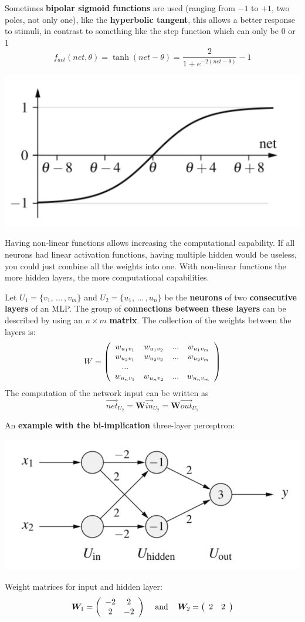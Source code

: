Sometimes \textbf{bipolar sigmoid functions} are used (ranging from $-1$ to $+1$, two poles, not only one), like the \textbf{hyperbolic tangent}, this allows a better response to stimuli, in contrast to something like the step function which can only be 0 or 1
$$ f_{act} (net, \theta) = \tanh (net - \theta) = \frac{2}{1 + e^{-2(net-\theta)}} - 1 $$
\begin{center}
	\includegraphics[width=0.48\columnwidth]{img/NN/sigmoid3}
\end{center}

Having non-linear functions allows increasing the computational capability. If all neurons had linear activation functions, having multiple hidden would be useless, you could just combine all the weights into one. With non-linear functions the more hidden layers, the more computational capabilities.\\

\newpage

Let $U_1 = \{v_1, \, ... \, , v_m \}$ and $U_2 = \{u_1, \, ... \, , u_n\}$ be the \textbf{neurons} of two \textbf{consecutive layers} of an MLP. The group of \textbf{connections between these layers} can be described by using an $n \times m$ \textbf{matrix}. The collection of the weights between the layers is: 
$$ 
W = \left(
\begin{array}{c c c c}
	w_{u_1 v_1} & w_{u_1 v_2} & ... & w_{u_1 v_m} \\
	w_{u_2 v_1} & w_{u_2 v_2} & ... & w_{u_2 v_m} \\
	... \\
	w_{u_n v_1} & w_{u_n v_2} & ... & w_{u_n v_m} 
\end{array}
\right)
$$
The computation of the network input can be written as 
$$ \vec{net}_{U_2} = \bm{W} \vec{in}_{U_2} = \bm{W} \vec{out}_{U_1} $$

An \textbf{example with the bi-implication} three-layer perceptron:
\begin{center}
	\includegraphics[width=0.65\columnwidth]{img/NN/bi_impl1}
\end{center}
Weight matrices for input and hidden layer: 
$$ \bm{W}_1 = \left(
\begin{array}{c c}
	-2 & 2 \\
	2 & -2 
\end{array}
\right)
\;\;\; \text{ and } \;\;\;
\bm{W}_2 = \left(
\begin{array}{c c}
	2 & 2 \\
\end{array}
\right)
$$

